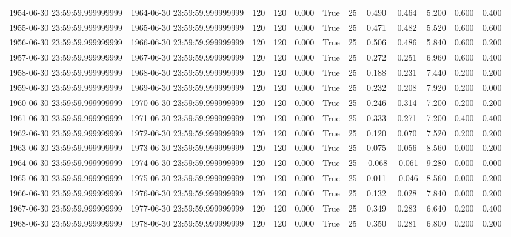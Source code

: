 \begin{table}
\begin{tabular}{lccccccccccc}
1954-06-30 23:59:59.999999999 & 1964-06-30 23:59:59.999999999 & 120 & 120 & 0.000 & True & 25 & 0.490 & 0.464 & 5.200 & 0.600 & 0.400 \\
1955-06-30 23:59:59.999999999 & 1965-06-30 23:59:59.999999999 & 120 & 120 & 0.000 & True & 25 & 0.471 & 0.482 & 5.520 & 0.600 & 0.600 \\
1956-06-30 23:59:59.999999999 & 1966-06-30 23:59:59.999999999 & 120 & 120 & 0.000 & True & 25 & 0.506 & 0.486 & 5.840 & 0.600 & 0.200 \\
1957-06-30 23:59:59.999999999 & 1967-06-30 23:59:59.999999999 & 120 & 120 & 0.000 & True & 25 & 0.272 & 0.251 & 6.960 & 0.600 & 0.400 \\
1958-06-30 23:59:59.999999999 & 1968-06-30 23:59:59.999999999 & 120 & 120 & 0.000 & True & 25 & 0.188 & 0.231 & 7.440 & 0.200 & 0.200 \\
1959-06-30 23:59:59.999999999 & 1969-06-30 23:59:59.999999999 & 120 & 120 & 0.000 & True & 25 & 0.232 & 0.208 & 7.920 & 0.200 & 0.000 \\
1960-06-30 23:59:59.999999999 & 1970-06-30 23:59:59.999999999 & 120 & 120 & 0.000 & True & 25 & 0.246 & 0.314 & 7.200 & 0.200 & 0.200 \\
1961-06-30 23:59:59.999999999 & 1971-06-30 23:59:59.999999999 & 120 & 120 & 0.000 & True & 25 & 0.333 & 0.271 & 7.200 & 0.400 & 0.400 \\
1962-06-30 23:59:59.999999999 & 1972-06-30 23:59:59.999999999 & 120 & 120 & 0.000 & True & 25 & 0.120 & 0.070 & 7.520 & 0.200 & 0.200 \\
1963-06-30 23:59:59.999999999 & 1973-06-30 23:59:59.999999999 & 120 & 120 & 0.000 & True & 25 & 0.075 & 0.056 & 8.560 & 0.000 & 0.200 \\
1964-06-30 23:59:59.999999999 & 1974-06-30 23:59:59.999999999 & 120 & 120 & 0.000 & True & 25 & -0.068 & -0.061 & 9.280 & 0.000 & 0.000 \\
1965-06-30 23:59:59.999999999 & 1975-06-30 23:59:59.999999999 & 120 & 120 & 0.000 & True & 25 & 0.011 & -0.046 & 8.560 & 0.000 & 0.200 \\
1966-06-30 23:59:59.999999999 & 1976-06-30 23:59:59.999999999 & 120 & 120 & 0.000 & True & 25 & 0.132 & 0.028 & 7.840 & 0.000 & 0.200 \\
1967-06-30 23:59:59.999999999 & 1977-06-30 23:59:59.999999999 & 120 & 120 & 0.000 & True & 25 & 0.349 & 0.283 & 6.640 & 0.200 & 0.400 \\
1968-06-30 23:59:59.999999999 & 1978-06-30 23:59:59.999999999 & 120 & 120 & 0.000 & True & 25 & 0.350 & 0.281 & 6.800 & 0.200 & 0.200 \\

\end{tabular}
\end{table}
